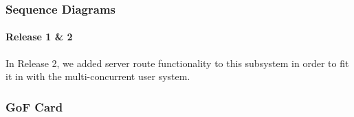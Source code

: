 \subsubsection{Sequence Diagrams}

\paragraph{Release 1 \& 2}

\indent
In Release 2, we added server route functionality to this subsystem in order to fit it in with the multi-concurrent user system.

\begin{center}
\end{center}

\newpage
\subsubsection{GoF Card}

